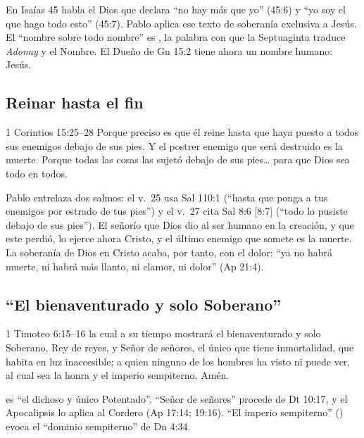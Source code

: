 En Isaías 45 habla el Dios que declara ``no hay más que yo'' (45:6) y ``yo \SENOR{} soy el que hago todo esto'' (45:7). Pablo aplica ese texto de soberanía exclusiva a Jesús. El ``nombre sobre todo nombre'' es , la palabra con que la Septuaginta traduce \emph{Adonay} y el Nombre. El Dueño de Gn 15:2 tiene ahora un nombre humano: Jesús.


\subsection{Reinar hasta el fin}
\begin{verso}{1 Corintios 15:25–28}
Porque preciso es que él reine hasta que haya puesto a todos sus enemigos debajo de sus pies. Y el postrer enemigo que será destruido es la muerte. Porque todas las cosas las sujetó debajo de sus pies\ldots{} para que Dios sea todo en todos.
\end{verso}

Pablo entrelaza dos salmos: el v.~25 usa Sal 110:1 (``hasta que ponga a tus enemigos por estrado de tus pies'') y el v.~27 cita Sal 8:6 [8:7] (``todo lo pusiste debajo de sus pies''). El señorío que Dios dio al ser humano en la creación, y que este perdió, lo ejerce ahora Cristo, y el último enemigo que somete es la muerte. La soberanía de Dios en Cristo acaba, por tanto, con el dolor: ``ya no habrá muerte, ni habrá más llanto, ni clamor, ni dolor'' (Ap 21:4).

\subsection{“El bienaventurado y solo Soberano”}
\begin{verso}{1 Timoteo 6:15–16}
la cual a su tiempo mostrará el bienaventurado y solo Soberano, Rey de reyes, y Señor de señores, el único que tiene inmortalidad, que habita en luz inaccesible; a quien ninguno de los hombres ha visto ni puede ver, al cual sea la honra y el imperio sempiterno. Amén.
\end{verso}

 es ``el dichoso y único Potentado''. ``Señor de señores'' procede de Dt 10:17, y el Apocalipsis lo aplica al Cordero (Ap 17:14; 19:16). ``El imperio sempiterno'' () evoca el ``dominio sempiterno'' de Dn 4:34.

